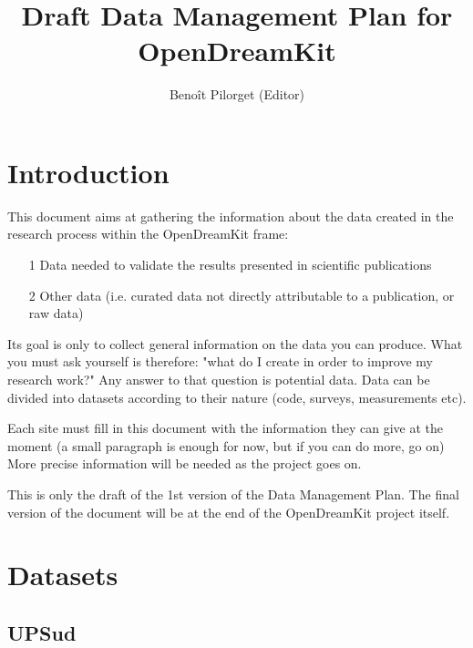 \documentclass[12pt]{article}
\title{Draft Data Management Plan for OpenDreamKit}
\author{Benoît Pilorget (Editor)}
\begin{document}
\maketitle
\tableofcontents\newpage

\section{Introduction}

This document aims at gathering the information about the data created in the research process within the OpenDreamKit frame:

\begin{enumerate}
\item[1] Data needed to validate the results presented in scientific publications
\item[2] Other data (i.e. curated data not directly attributable to a publication, or raw data)
\end{enumerate}
Its goal is only to collect general information on the data you can produce. 
What you must ask yourself is therefore: "what do I create in order to improve my research work?"
Any answer to that question is potential data. Data can be divided into datasets according to their nature (code, surveys, measurements etc).

Each site must fill in this document with the information they can give at the moment (a small paragraph is enough for now, but if you can do more, go on) More precise information will be needed as the project goes on.

This is only the draft of the 1st version of the Data Management Plan.
The final version of the document will be at the end of the OpenDreamKit project itself.



\section{Datasets}

\subsection{UPSud}
\end{document}
